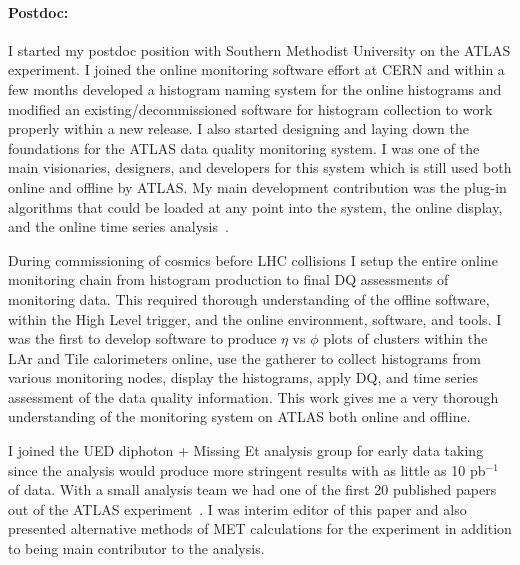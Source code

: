 \paragraph{Postdoc:}I started my postdoc position with Southern Methodist University on the ATLAS experiment.  I joined the online monitoring software effort at CERN and within a few months developed a histogram
naming system for the online histograms and modified an existing/decommissioned software for histogram collection to work properly within a new release.  
I also started designing and laying down the foundations for the ATLAS data quality monitoring system.  I was one of the main visionaries, designers, and developers for this system
which is still used both online and offline by ATLAS. My main development contribution was the plug-in algorithms that could be loaded at any point into the system, the online display, and the online time series analysis~\cite{atl5b,atl6}.

During commissioning of cosmics before LHC collisions I setup the entire online monitoring chain from histogram production to final DQ assessments of monitoring data.  This required thorough understanding
of the offline software, within the High Level trigger, and the online environment, software, and tools.  I was the first to develop software to produce $\eta$ vs $\phi$ plots of clusters within the LAr and Tile calorimeters online, use the gatherer to
collect histograms from various monitoring nodes, display the histograms, apply DQ, and time series assessment of the data quality information.  This work gives me a very thorough understanding of the monitoring system on ATLAS both online and offline.

I joined the UED diphoton + Missing Et analysis group for early data taking since the analysis would produce more stringent results with as little as 10 pb$^{-1}$ of data.  With a small analysis team we had one of the first 20 published papers
out of the ATLAS experiment~\cite{atl2}. I was interim editor of this paper and also presented alternative methods of MET calculations for the experiment in addition to being main contributor to the analysis. 

